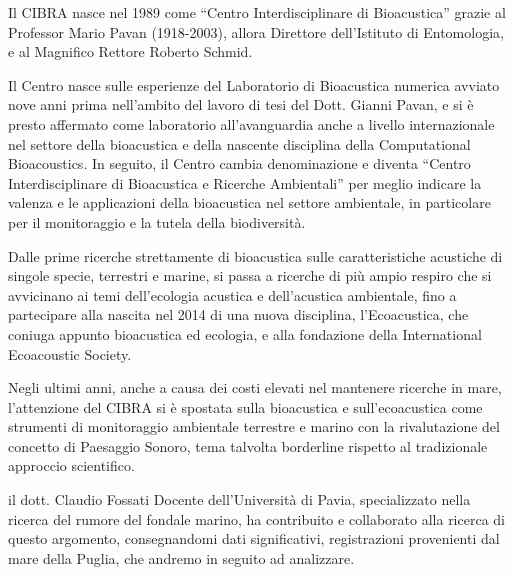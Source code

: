 Il CIBRA nasce nel 1989 come “Centro Interdisciplinare di Bioacustica” grazie al Professor Mario Pavan (1918-2003), allora Direttore dell'Istituto di Entomologia, e al Magnifico Rettore Roberto Schmid. 

Il Centro nasce sulle esperienze del Laboratorio di Bioacustica numerica avviato nove anni prima nell’ambito del lavoro di tesi del Dott. Gianni Pavan, e si è presto affermato come laboratorio all'avanguardia anche a livello internazionale nel settore della bioacustica e della nascente disciplina della Computational Bioacoustics.
In seguito, il Centro cambia denominazione e diventa “Centro Interdisciplinare di Bioacustica e Ricerche Ambientali” per meglio indicare la valenza e le applicazioni della bioacustica nel settore ambientale, in particolare per il monitoraggio e la tutela della biodiversità.

Dalle prime ricerche strettamente di bioacustica sulle caratteristiche acustiche di singole specie, terrestri e marine, si passa a ricerche di più ampio respiro che si avvicinano ai temi dell'ecologia acustica e dell'acustica ambientale, fino a partecipare alla nascita nel 2014 di una nuova disciplina, l’Ecoacustica, che coniuga appunto bioacustica ed ecologia, e alla fondazione della International Ecoacoustic Society.

Negli ultimi anni, anche a causa dei costi elevati nel mantenere ricerche in mare, l'attenzione del CIBRA si è spostata sulla bioacustica e sull’ecoacustica come strumenti di monitoraggio ambientale terrestre e marino con la rivalutazione del concetto di Paesaggio Sonoro, tema talvolta borderline rispetto al tradizionale approccio scientifico.

il dott. Claudio Fossati Docente dell'Università di Pavia, specializzato nella ricerca del rumore del fondale marino, ha contribuito e collaborato alla ricerca di questo argomento, consegnandomi dati significativi, registrazioni provenienti dal mare della Puglia, che andremo in seguito ad analizzare. 

